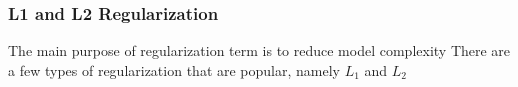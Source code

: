 \subsubsection{L1 and L2 Regularization}

The main purpose of regularization term is to reduce model complexity There are a few types of regularization that are popular, namely $L_1$ and $L_2$